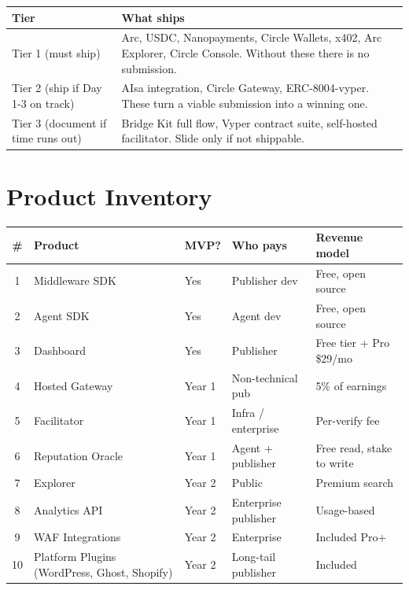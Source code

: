 \documentclass[11pt,a4paper]{article}
\begin{document}
\begin{table}[H]
\centering
\footnotesize
\begin{tabularx}{\textwidth}{@{} l X @{}}
\toprule
\textbf{Tier} & \textbf{What ships} \\
\midrule
Tier 1 (must ship) & Arc, USDC, Nanopayments, Circle Wallets, x402, Arc Explorer, Circle Console. Without these there is no submission. \\
Tier 2 (ship if Day 1-3 on track) & AIsa integration, Circle Gateway, ERC-8004-vyper. These turn a viable submission into a winning one. \\
Tier 3 (document if time runs out) & Bridge Kit full flow, Vyper contract suite, self-hosted facilitator. Slide only if not shippable. \\
\bottomrule
\end{tabularx}
\end{table}

\newpage

\section{Product Inventory}

\begin{table}[H]
\centering
\footnotesize
\begin{tabularx}{\textwidth}{@{} c l l l X @{}}
\toprule
\textbf{\#} & \textbf{Product} & \textbf{MVP?} & \textbf{Who pays} & \textbf{Revenue model} \\
\midrule
1 & Middleware SDK & Yes & Publisher dev & Free, open source \\
2 & Agent SDK & Yes & Agent dev & Free, open source \\
3 & Dashboard & Yes & Publisher & Free tier + Pro \$29/mo \\
4 & Hosted Gateway & Year 1 & Non-technical pub & 5\% of earnings \\
5 & Facilitator & Year 1 & Infra / enterprise & Per-verify fee \\
6 & Reputation Oracle & Year 1 & Agent + publisher & Free read, stake to write \\
7 & Explorer & Year 2 & Public & Premium search \\
8 & Analytics API & Year 2 & Enterprise publisher & Usage-based \\
9 & WAF Integrations & Year 2 & Enterprise & Included Pro+ \\
10 & Platform Plugins (WordPress, Ghost, Shopify) & Year 2 & Long-tail publisher & Included \\
\bottomrule
\end{tabularx}
\end{table}
\end{document}
